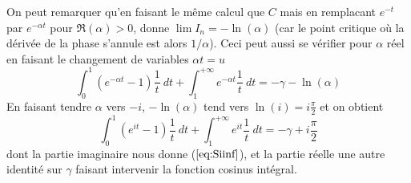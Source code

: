 \documentclass[a4paper,11pt]{book}
\begin{document}
\begin{giacjshere}
On peut remarquer qu'en faisant le m\^eme calcul que $C$ 
mais en remplacant $e^{-t}$ par $e^{-\alpha t}$ pour $\Re(\alpha)>0$, donne
$\lim I_n=-\ln(\alpha)$ (car le point critique o\`u la d\'eriv\'ee
de la phase s'annule est alors $1/\alpha$). Ceci peut aussi se v\'erifier
pour $\alpha$ r\'eel en faisant le changement de variables $\alpha t=u$
\[ \int_0^{1}(e^{-\alpha t}-1)\frac{1}{t} \ dt + \int_1^{+\infty} e^{-\alpha t} \frac{1}{t} \ dt 
= -\gamma -\ln(\alpha) \]
En faisant tendre $\alpha$ vers $-i$, $-\ln(\alpha)$ 
tend vers $\ln(i)=i\frac{\pi}{2}$ et on obtient
\[ \int_0^{1}(e^{it}-1)\frac{1}{t} \ dt + \int_1^{+\infty} e^{i t} \frac{1}{t} \ dt 
= -\gamma + i \frac{\pi}{2} \]
dont la partie imaginaire nous donne (\(\ref{eq:Siinf}\)), et la
partie r\'eelle une autre identit\'e sur $\gamma$ faisant intervenir
la fonction cosinus int\'egral.


\end{giacjshere}
\end{document}

